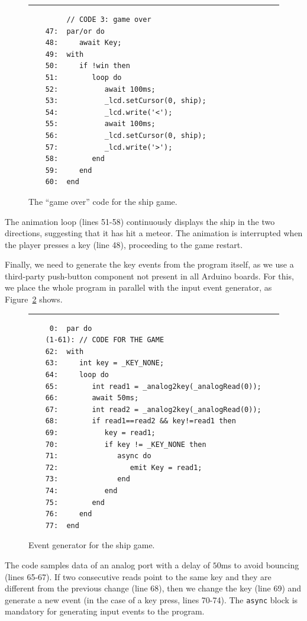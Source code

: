 \documentclass[11pt,a4paper]{article}
\newcommand{\2}{\;\;}
\newcommand{\5}{\;\;\;\;\;}
\newcommand{\code}[1] {{\small{\texttt{#1}}}}
\begin{document}
\begin{figure}[h]
\rule{15cm}{0.37pt}
{\small
\begin{verbatim}
         // CODE 3: game over
    47:  par/or do
    48:     await Key;
    49:  with
    50:     if !win then
    51:        loop do
    52:           await 100ms;
    53:           _lcd.setCursor(0, ship);
    54:           _lcd.write('<');
    55:           await 100ms;
    56:           _lcd.setCursor(0, ship);
    57:           _lcd.write('>');
    58:        end
    59:     end
    60:  end
\end{verbatim}
}
\caption{ The ``game over'' code for the ship game.
\label{lst:demos:ship:4}
}
\end{figure}

The animation loop (lines 51-58) continuously displays the ship in the two 
directions, suggesting that it has hit a meteor.
The animation is interrupted when the player presses a key (line 48), 
proceeding to the game restart.

Finally, we need to generate the key events from the program itself, as we use 
a third-party push-button component not present in all Arduino boards.
For this, we place the whole program in parallel with the input event 
generator, as Figure~\ref{lst:demos:ship:5} shows.

\begin{figure}[t]
\rule{15cm}{0.37pt}
{\small
\begin{verbatim}
     0:  par do
    (1-61): // CODE FOR THE GAME
    62:  with
    63:     int key = _KEY_NONE;
    64:     loop do
    65:        int read1 = _analog2key(_analogRead(0));
    66:        await 50ms;
    67:        int read2 = _analog2key(_analogRead(0));
    68:        if read1==read2 && key!=read1 then
    69:           key = read1;
    70:           if key != _KEY_NONE then
    71:              async do
    72:                 emit Key = read1;
    73:              end
    74:           end
    75:        end
    76:     end
    77:  end
\end{verbatim}
}
\caption{ Event generator for the ship game.
\label{lst:demos:ship:5}
}
\end{figure}

The code samples data of an analog port with a delay of $50$ms to avoid 
bouncing (lines 65-67).
If two consecutive reads point to the same key and they are different from the 
previous change (line 68), then we change the key (line 69) and generate a new 
event (in the case of a key press, lines 70-74).
The \code{async} block is mandatory for generating input events to the program.
\end{document}
